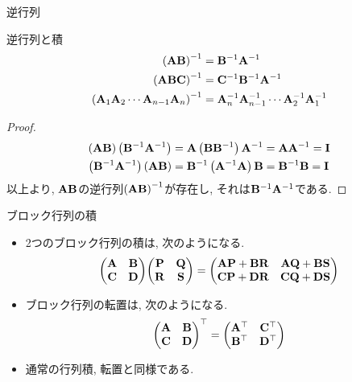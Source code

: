 \documentclass[dvipdfmx,notheorems,t]{beamer}
\begin{document}
\begin{frame}{逆行列}
\begin{block}{逆行列と積}
  \begin{align*}
    \left( \vb{A} \vb{B} \right)^{-1} &= \vb{B}^{-1} \vb{A}^{-1} \\
    \left( \vb{A} \vb{B} \vb{C} \right)^{-1} &= \vb{C}^{-1} \vb{B}^{-1} \vb{A}^{-1} \\
    \left( \vb{A}_1 \vb{A}_2 \cdots \vb{A}_{n - 1} \vb{A}_n \right)^{-1}
      &= \vb{A}_n^{-1} \vb{A}_{n - 1}^{-1} \cdots \vb{A}_2^{-1} \vb{A}_1^{-1}
  \end{align*}
\end{block}

\begin{proof}
  \begin{align*}
    \left( \vb{A} \vb{B} \right) \left( \vb{B}^{-1} \vb{A}^{-1} \right)
      &= \vb{A} \left( \vb{B} \vb{B}^{-1} \right) \vb{A}^{-1}
      = \vb{A} \vb{A}^{-1} = \vb{I} \\
    \left( \vb{B}^{-1} \vb{A}^{-1} \right) \left( \vb{A} \vb{B} \right)
      &= \vb{B}^{-1} \left( \vb{A}^{-1} \vb{A} \right) \vb{B}
      = \vb{B}^{-1} \vb{B} = \vb{I}
  \end{align*}
  以上より, $\vb{A} \vb{B}$の逆行列$\left( \vb{A} \vb{B} \right)^{-1}$が存在し,
  それは$\vb{B}^{-1} \vb{A}^{-1}$である.
\end{proof}
\end{frame}

\begin{frame}{ブロック行列の積}
\begin{itemize}
  \item 2つのブロック行列の積は, 次のようになる.
  \begin{align*}
    \mqty(\vb{A} & \vb{B} \\ \vb{C} & \vb{D})
      \mqty(\vb{P} & \vb{Q} \\ \vb{R} & \vb{S})
      = \mqty(\vb{A} \vb{P} + \vb{B} \vb{R} & \vb{A} \vb{Q} + \vb{B} \vb{S} \\
        \vb{C} \vb{P} + \vb{D} \vb{R} & \vb{C} \vb{Q} + \vb{D} \vb{S})
  \end{align*}
  \item ブロック行列の転置は, 次のようになる.
  \begin{align*}
    \mqty(\vb{A} & \vb{B} \\ \vb{C} & \vb{D})^\top
      = \mqty(\vb{A}^\top & \vb{C}^\top \\ \vb{B}^\top & \vb{D}^\top)
  \end{align*}
  \item 通常の行列積, 転置と同様である.
\end{itemize}
\end{frame}
\end{document}
